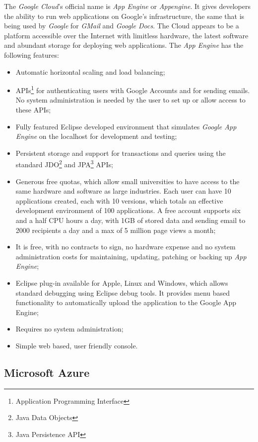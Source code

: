 The \textit{Google Cloud}'s official name is \textit{App Engine} or \textit{Appengine}. It gives developers the ability to run web applications on Google's infrastructure, the same that is being used by \textit{Google} for \textit{GMail} and \textit{Google Docs}.
The Cloud appears to be a platform accessible over the Internet with limitless hardware, the latest software and abundant storage for deploying web applications.
The \textit{App Engine} has the following features:
\begin{itemize}
\item Automatic horizontal scaling and load balancing;
\item APIs\footnote{Application Programming Interface} for authenticating users with Google Accounts and for sending emails. No system administration is needed by the user to set up or allow access to these APIs;
\item Fully featured Eclipse developed environment that simulates \textit{Google App Engine} on the localhost for development and testing;
\item Persistent storage and support for transactions and queries using the standard JDO\footnote{Java Data Objects} and JPA\footnote{Java Persistence API} APIs;
\item Generous free quotas, which allow small universities to have access to the same hardware and software as large industries. Each user can have 10 applications created, each with 10 versions, which totals an effective development environment of 100 applications. A free account supports six and a half CPU hours a day, with 1GB of stored data and sending email to 2000 recipients a day and a max of 5 million page views a month;
\item It is free, with no contracts to sign, no hardware expense and no system administration costs for maintaining, updating, patching or backing up \textit{App Engine};
\item Eclipse plug-in available for Apple, Linux and Windows, which allows standard debugging using Eclipse debug tools. It provides menu based functionality to automatically upload the application to the Google App Engine;
\item Requires no system administration;
\item Simple web based, user friendly console.\cite{googleapp}
\end{itemize} 

\subsection{Microsoft Azure}\label{azure}

